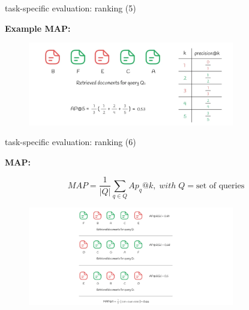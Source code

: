 \begin{vbframe}{task-specific evaluation: ranking (5)}

\vfill

\textbf{Example MAP:}

\begin{figure}
    \centering
    \includegraphics[width=9cm]{figure/42-ap-ex3.png}
\end{figure}

\vfill

\end{vbframe}


\begin{vbframe}{task-specific evaluation: ranking (6)}

\vfill

\textbf{MAP:}

$$MAP = \dfrac{1}{|Q|} \sum_{q \in Q} Ap_q@k,\; with\; Q = \text{set of queries}$$

\begin{figure}
    \centering
    \includegraphics[width=9cm]{figure/42-ap-ex4.png}
\end{figure}

\vfill

\end{vbframe}

